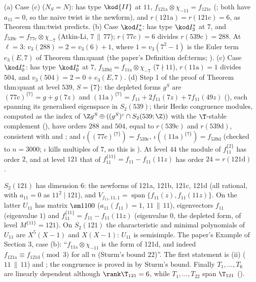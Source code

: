 \begin{example}\label{ex:hecke:twist-pairs}
(a) Case (c) ($N_S=N$):  has type $\kod{II}$ at $11$, $f_{\text{121a}}\otimes\chi_{-11}=f_{\text{121c}}$ (; both have $a_{11}=0$, so the naive twist is the newform), and
$r(\text{121a})=r(\text{121c})=6$, as Theorem thm:twist predicts.
(b) Case $\kod I_n^*$:  has type $\kod I_3^*$ at $7$, and $f_{\text{539c}}=f_{\text{77c}}\otimes\chi_{-7}$ (Atkin-Li, $7\,\|\,77$); $r(\text{77c})=6$ divides $r(\text{539c})=288$. At $\ell=3$: $v_3(288)=2=v_3(6)+1$,
where $1=v_3(7^2-1)$ is the Euler term $e_3(E,7)$ of Theorem thm:quant (the paper's Definition def:terms; ).
(c) Case $\kod I_0^*$:  has type $\kod I_0^*$ at $7$, $f_{\text{539d}}=f_{\text{11a}}\otimes\chi_{-7}$ ($7\nmid11$), $r(\text{11a})=1$ divides $504$, and $v_3(504)=2=0+e_3(E,7)$.
(d) Step 1 of the proof of Theorem thm:quant at level $539$, $S=\{7\}$: the depleted forms $g^S$ are $(\text{77c})^{\{7\}}=g+g(7z)$ and $(\text{11a})^{\{7\}}=f_{11}+2f_{11}(7z)+7f_{11}(49z)$ (),
each spanning its generalised eigenspace in $S_2(539)$; their Hecke congruence modules, computed as the index of $\Z g^S\oplus((g^S)^c\cap S_2(539;\Z))$ with the $\T$-stable complement
(), have orders $288$ and $504$, equal to $r(\text{539c})$ and $r(\text{539d})$, consistent with  and ; and $\iota((\text{77c})^{\{7\}})=f_{\text{539c}}$,
$\iota((\text{11a})^{\{7\}})=f_{\text{539d}}$ (checked to $n=3000$; $\iota$ kills multiples of $7$, so this is ). At level $44$ the module of $f_{11}^{\{2\}}$ has order $2$, and
at level $121$ that of $f_{11}^{\{11\}}=f_{11}-f_{11}(11z)$ has order $24=r(\text{121d})$.
\end{example}

\begin{example}[level $121$]\label{ex:hecke:level-121}
$S_2(121)$ has dimension $6$: the newforms of 121a, 121b, 121c, 121d (all rational, with $a_{11}=0$ as $11^2\mid121$), and $V_{f_{11},11,1}=\operatorname{span}\{f_{11}(z),f_{11}(11z)\}$. On the latter $U_{11}$ has
matrix $\sm1100$ ($a_{11}(f_{11})=1$, $11\,\|\,11$), eigenvectors $f_{11}$ (eigenvalue $1$) and $f_{11}^{\{11\}}=f_{11}-f_{11}(11z)$ (eigenvalue $0$, the depleted form, of level $M^{\{11\}}=121$). On $S_2(121)$ the
characteristic and minimal polynomials of $U_{11}$ are $X^5(X-1)$ and $X(X-1)$: $U_{11}$ is semisimple. The paper's Example of Section 3, case (b): ``$f_{\text{11a}}\otimes\chi_{-11}$ is the form of 121d,
and indeed $f_{\text{121a}}\equiv f_{\text{121d}}\pmod 3$ for all $n$ (Sturm's bound $22$)''. The first statement is (ii) ($11\,\|\,11$) and ; the
congruence is proved in  by Sturm's bound. Finally $T_1,\dots,T_6$ are linearly dependent although $\rank\T_{121}=6$, while $T_1,\dots,T_{22}$ span $\T_{121}$
().
\end{example}

